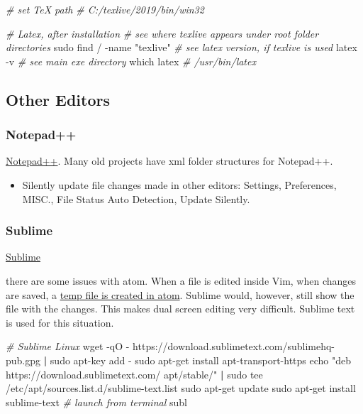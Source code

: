 \documentclass[]{article}
\newenvironment{Shaded}{\begin{snugshade}}{\end{snugshade}}
\newcommand{\BuiltInTok}[1]{#1}
\newcommand{\CommentTok}[1]{\textcolor[rgb]{0.56,0.35,0.01}{\textit{#1}}}
\newcommand{\ExtensionTok}[1]{#1}
\newcommand{\FunctionTok}[1]{\textcolor[rgb]{0.00,0.00,0.00}{#1}}
\newcommand{\KeywordTok}[1]{\textcolor[rgb]{0.13,0.29,0.53}{\textbf{#1}}}
\newcommand{\NormalTok}[1]{#1}
\newcommand{\StringTok}[1]{\textcolor[rgb]{0.31,0.60,0.02}{#1}}
\providecommand{\tightlist}{%
  \setlength{\itemsep}{0pt}\setlength{\parskip}{0pt}}
\begin{document}
\begin{Shaded}
\begin{Highlighting}[]
\CommentTok{# set TeX path}
\CommentTok{# C:/texlive/2019/bin/win32}

\CommentTok{# Latex, after installation}
\CommentTok{# see where texlive appears under root folder directories}
\FunctionTok{sudo}\NormalTok{ find / -name }\StringTok{"texlive"}
\CommentTok{# see latex version, if texlive is used}
\ExtensionTok{latex}\NormalTok{ -v}
\CommentTok{# see main exe directory}
\FunctionTok{which}\NormalTok{ latex}
\CommentTok{# /usr/bin/latex}
\end{Highlighting}
\end{Shaded}

\hypertarget{other-editors}{%
\subsection{Other Editors}\label{other-editors}}

\hypertarget{notepad}{%
\subsubsection{Notepad++}\label{notepad}}

\href{https://notepad-plus-plus.org/downloads/v7.8.2/}{Notepad++}. Many
old projects have xml folder structures for Notepad++.

\begin{itemize}
\tightlist
\item
  Silently update file changes made in other editors: Settings,
  Preferences, MISC., File Status Auto Detection, Update Silently.
\end{itemize}

\hypertarget{sublime}{%
\subsubsection{Sublime}\label{sublime}}

\href{https://www.sublimetext.com/3}{Sublime}

there are some issues with atom. When a file is edited inside Vim, when
changes are saved, a
\href{https://github.com/atom/atom/issues/17186}{temp file is created in
atom}. Sublime would, however, still show the file with the changes.
This makes dual screen editing very difficult. Sublime text is used for
this situation.

\begin{Shaded}
\begin{Highlighting}[]
\CommentTok{# Sublime Linux}
\FunctionTok{wget}\NormalTok{ -qO - https://download.sublimetext.com/sublimehq-pub.gpg }\KeywordTok{|} \FunctionTok{sudo}\NormalTok{ apt-key add -}
\FunctionTok{sudo}\NormalTok{ apt-get install apt-transport-https}
\BuiltInTok{echo} \StringTok{"deb https://download.sublimetext.com/ apt/stable/"} \KeywordTok{|} \FunctionTok{sudo}\NormalTok{ tee /etc/apt/sources.list.d/sublime-text.list}
\FunctionTok{sudo}\NormalTok{ apt-get update}
\FunctionTok{sudo}\NormalTok{ apt-get install sublime-text}
\CommentTok{# launch from terminal}
\ExtensionTok{subl}
\end{Highlighting}
\end{Shaded}
\end{document}
